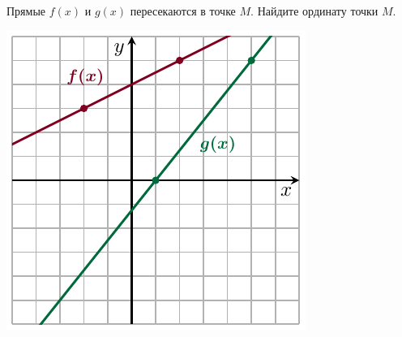 \begin{ex}
	\begin{minipage}[t]{0.7\textwidth}
		Прямые $f(x)$ и $g(x)$ пересекаются в точке $M$. Найдите ординату точки $M$.
	\end{minipage}
	\begin{minipage}[c]{0.25\textwidth}
		\includegraphics[align=t, width=\textwidth]{graphs/graph_24/graph_24}
	\end{minipage}
\end{ex}